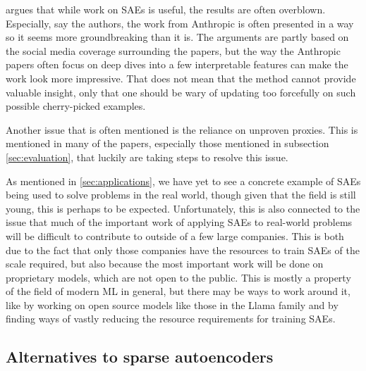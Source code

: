 \textcite{casper_eis_2024} argues that while work on SAEs is useful, the results are often overblown.
Especially, say the authors, the work from Anthropic \parencite{bricken_towards_2023}\parencite{templeton_scaling_2024} is often presented in a way so it seems more groundbreaking than it is.
The arguments are partly based on the social media coverage surrounding the papers, but the way the Anthropic papers often focus on deep dives into a few interpretable features can make the work look more impressive.
That does not mean that the method cannot provide valuable insight, only that one should be wary of updating too forcefully on such possible cherry-picked examples.

Another issue that is often mentioned is the reliance on unproven proxies.
This is mentioned in many of the papers, especially those mentioned in subsection \ref{sec:evaluation}, that luckily are taking steps to resolve this issue.

As mentioned in \ref{sec:applications}, we have yet to see a concrete example of SAEs being used to solve problems in the real world, though given that the field is still young, this is perhaps to be expected.
Unfortunately, this is also connected to the issue that much of the important work of applying SAEs to real-world problems will be difficult to contribute to outside of a few large companies.
This is both due to the fact that only those companies have the resources to train SAEs of the scale required, but also because the most important work will be done on proprietary models, which are not open to the public.
This is mostly a property of the field of modern ML in general, but there may be ways to work around it, like by working on open source models like those in the Llama family \parencite{touvron_llama_nodate} and by finding ways of vastly reducing the resource requirements for training SAEs.


\subsection{Alternatives to sparse autoencoders}\label{sec:alternatives_to_saes}

